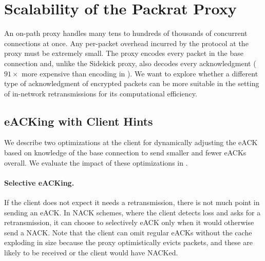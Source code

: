 \section{Scalability of the Packrat Proxy}
\label{sec:eack}
An on-path proxy handles many tens to hundreds of thousands of concurrent connections at once.
Any per-packet overhead incurred by the \Sys protocol at the proxy must be
extremely small. The \Sys proxy encodes every packet in the base connection and, unlike
the Sidekick proxy, also decodes every acknowledgment
($91\!\times$ more expensive than encoding in \cite{yuan2024sidekick}).
We want to explore whether a different type of acknowledgment of encrypted packets
can be more suitable in the setting of in-network
retransmissions for its computational efficiency.

\subsection{eACKing with Client Hints}
\label{sec:eack:hints}

We describe two optimizations at the client for dynamically adjusting the eACK
based on knowledge of the base connection to send smaller and fewer eACKs
overall.
We evaluate the impact of these optimizations in .

\paragraph{Selective eACKing.} If the client does not expect it needs a
 retransmission, there is not much point in sending an eACK. In NACK schemes,
 where the client detects loss and asks for a retransmission, it can choose to
 selectively eACK only when it would otherwise send a NACK. Note that the client can omit
 regular eACKs without the cache exploding in size because the proxy
 optimistically evicts packets, and these are likely to be received or the
 client would have NACKed.\\

